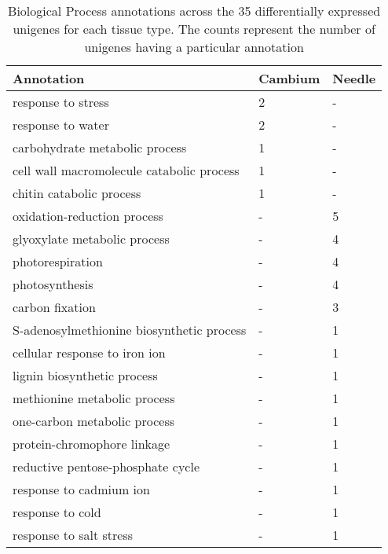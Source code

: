 \begin{table}[t]
\centering
\caption{Biological Process annotations across the 35 differentially expressed 
unigenes for each tissue type. The counts represent the number of unigenes 
having a particular annotation}

\begin{tabular}{lll}
\toprule
Annotation & Cambium & Needle \\
\midrule
response to stress                        &  2 &  - \\
response to water                         &  2 &  - \\
carbohydrate metabolic process            &  1 &  - \\
cell wall macromolecule catabolic process &  1 &  - \\
chitin catabolic process                  &  1 &  - \\
oxidation-reduction process               &  - &  5 \\
glyoxylate metabolic process              &  - &  4 \\
photorespiration                          &  - &  4 \\
photosynthesis                            &  - &  4 \\
carbon fixation                           &  - &  3 \\
S-adenosylmethionine biosynthetic process &  - &  1 \\
cellular response to iron ion             &  - &  1 \\
lignin biosynthetic process               &  - &  1 \\
methionine metabolic process              &  - &  1 \\
one-carbon metabolic process              &  - &  1 \\
protein-chromophore linkage               &  - &  1 \\
reductive pentose-phosphate cycle         &  - &  1 \\
response to cadmium ion                   &  - &  1 \\
response to cold                          &  - &  1 \\
response to salt stress                   &  - &  1 \\
\bottomrule
\end{tabular}
\label{tab:dge_bp}
\end{table}